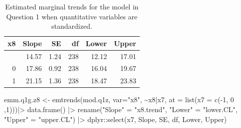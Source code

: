 \documentclass[
]{article}
\newenvironment{Shaded}{\begin{snugshade}}{\end{snugshade}}
\newcommand{\AttributeTok}[1]{\textcolor[rgb]{0.40,0.45,0.13}{#1}}
\newcommand{\DecValTok}[1]{\textcolor[rgb]{0.68,0.00,0.00}{#1}}
\newcommand{\FunctionTok}[1]{\textcolor[rgb]{0.28,0.35,0.67}{#1}}
\newcommand{\NormalTok}[1]{\textcolor[rgb]{0.00,0.23,0.31}{#1}}
\newcommand{\OtherTok}[1]{\textcolor[rgb]{0.00,0.23,0.31}{#1}}
\newcommand{\SpecialCharTok}[1]{\textcolor[rgb]{0.37,0.37,0.37}{#1}}
\newcommand{\StringTok}[1]{\textcolor[rgb]{0.13,0.47,0.30}{#1}}
\begin{document}
\normalsize

\normalsize

{

\begin{longtable}[]{@{}rrrrrr@{}}

\caption{\label{tbl-q1-emtrends-z7}Estimated marginal trends for the
model in Question 1 when quantitative variables are standardized.}

\tabularnewline

\toprule\noalign{}
x8 & Slope & SE & df & Lower & Upper \\
\midrule\noalign{}
\endhead
\bottomrule\noalign{}
\endlastfoot
-1 & 14.57 & 1.24 & 238 & 12.12 & 17.01 \\
0 & 17.86 & 0.92 & 238 & 16.04 & 19.67 \\
1 & 21.15 & 1.36 & 238 & 18.47 & 23.83 \\

\end{longtable}

}

\normalsize

\scriptsize

\begin{Shaded}
\begin{Highlighting}[numbers=left,,]
\NormalTok{emm.q1g.z8 }\OtherTok{\textless{}{-}} \FunctionTok{emtrends}\NormalTok{(mod.q1z, }\AttributeTok{var=}\StringTok{"x8"}\NormalTok{, }\SpecialCharTok{\textasciitilde{}}\NormalTok{x8}\SpecialCharTok{|}\NormalTok{x7,}
                      \AttributeTok{at =} \FunctionTok{list}\NormalTok{(}\AttributeTok{x7 =} \FunctionTok{c}\NormalTok{(}\SpecialCharTok{{-}}\DecValTok{1}\NormalTok{, }\DecValTok{0}\NormalTok{ ,}\DecValTok{1}\NormalTok{)))}\SpecialCharTok{|\textgreater{}}
              \FunctionTok{data.frame}\NormalTok{() }\SpecialCharTok{|\textgreater{}}
              \FunctionTok{rename}\NormalTok{(}\StringTok{"Slope"}  \OtherTok{=} \StringTok{"x8.trend"}\NormalTok{,}
                    \StringTok{"Lower"} \OtherTok{=} \StringTok{"lower.CL"}\NormalTok{,}
                    \StringTok{"Upper"} \OtherTok{=} \StringTok{"upper.CL"}\NormalTok{) }\SpecialCharTok{|\textgreater{}}
\NormalTok{              dplyr}\SpecialCharTok{::}\FunctionTok{select}\NormalTok{(x7, Slope, SE, df, Lower, Upper)}
\end{Highlighting}
\end{Shaded}

\normalsize

\normalsize
\end{document}
